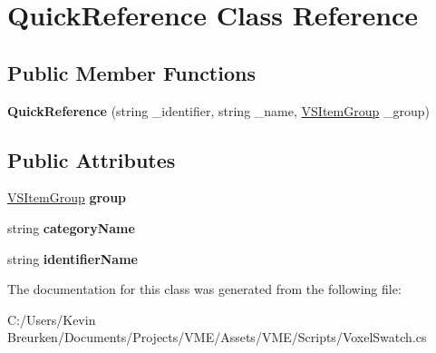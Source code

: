 \hypertarget{class_quick_reference}{}\section{Quick\+Reference Class Reference}
\label{class_quick_reference}
\subsection*{Public Member Functions}
\begin{DoxyCompactItemize}
\item 
{\bfseries Quick\+Reference} (string \+\_\+identifier, string \+\_\+name, \hyperlink{class_v_s_item_group}{V\+S\+Item\+Group} \+\_\+group)\hypertarget{class_quick_reference_a3c4d741b6a4aabe08e6dcedd92cb0e8e}{}\label{class_quick_reference_a3c4d741b6a4aabe08e6dcedd92cb0e8e}

\end{DoxyCompactItemize}
\subsection*{Public Attributes}
\begin{DoxyCompactItemize}
\item 
\hyperlink{class_v_s_item_group}{V\+S\+Item\+Group} {\bfseries group}\hypertarget{class_quick_reference_a2577ee7eda4a72093d833ea54233fb4a}{}\label{class_quick_reference_a2577ee7eda4a72093d833ea54233fb4a}

\item 
string {\bfseries category\+Name}\hypertarget{class_quick_reference_af6750014f28775276a70340038c1a37d}{}\label{class_quick_reference_af6750014f28775276a70340038c1a37d}

\item 
string {\bfseries identifier\+Name}\hypertarget{class_quick_reference_a2e50aa42ae676759e2cb0f627ba9fccb}{}\label{class_quick_reference_a2e50aa42ae676759e2cb0f627ba9fccb}

\end{DoxyCompactItemize}


The documentation for this class was generated from the following file\+:\begin{DoxyCompactItemize}
\item 
C\+:/\+Users/\+Kevin Breurken/\+Documents/\+Projects/\+V\+M\+E/\+Assets/\+V\+M\+E/\+Scripts/Voxel\+Swatch.\+cs\end{DoxyCompactItemize}
